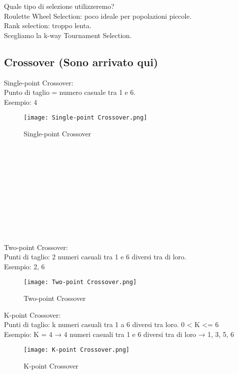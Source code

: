 \documentclass[10pt,a4paper]{article}
\begin{document}
    Quale tipo di selezione utilizzeremo?\\
    Roulette Wheel Selection: poco ideale per popolazioni piccole.\\
    Rank selection: troppo lenta.\\
    Scegliamo la k-way Tournament Selection.\\
    
    \subsection{Crossover (Sono arrivato qui)}
    \label{Crossover}
    Single-point Crossover:\\
    Punto di taglio  = numero casuale tra 1 e 6.\\
    Esempio: 4
    \begin{figure}[h!]
      \centering
      \caption{Single-point Crossover}
      \texttt{[image: Single-point Crossover.png]}
      \label{Single-pointCrossover}
    \end{figure}\\\\\\\\\\\\\\\\\\\\
    
    
    Two-point Crossover:\\
    Punti di taglio: 2 numeri casuali tra 1 e 6 diversi tra di loro.\\
    Esempio: 2, 6
    \begin{figure}[h!]
      \centering
      \caption{Two-point Crossover}
      \texttt{[image: Two-point Crossover.png]}
      \label{Two-pointCrossover}
    \end{figure}
    
    K-point Crossover:\\
    Punti di taglio: k numeri casuali tra 1 a 6 diversi tra loro. 0 < K <= 6\\
    Esempio: K = 4 → 4 numeri casuali tra 1 e 6 diversi tra di loro → 1, 3, 5, 6
    \begin{figure}[h!]
      \centering
      \caption{K-point Crossover}
      \texttt{[image: K-point Crossover.png]}
      \label{K-pointCrossover}
    \end{figure}
    
\end{document}
